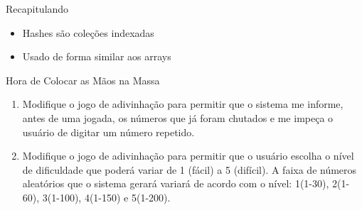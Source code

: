 
\begin{frame}[fragile,t]{Recapitulando}
  \begin{itemize}
    \item Hashes são \alert{coleções indexadas}
    \item Usado de forma \alert{similar aos arrays}
  \end{itemize}
\end{frame}

\begin{frame}{Hora de Colocar as Mãos na Massa}
  \begin{enumerate}
    \item Modifique o jogo de adivinhação para permitir que o sistema me informe, antes de  uma jogada, 
		os números que já foram chutados e me impeça o usuário de digitar um número repetido.

    \item Modifique o jogo de adivinhação para permitir que o usuário escolha o nível de dificuldade 
		que poderá variar de 1 (fácil) a 5 (difícil). A faixa de números aleatórios que o sistema 
		gerará variará de acordo com o nível: 1(1-30), 2(1-60), 3(1-100), 4(1-150) e 5(1-200).
    
  \end{enumerate}
\end{frame}



